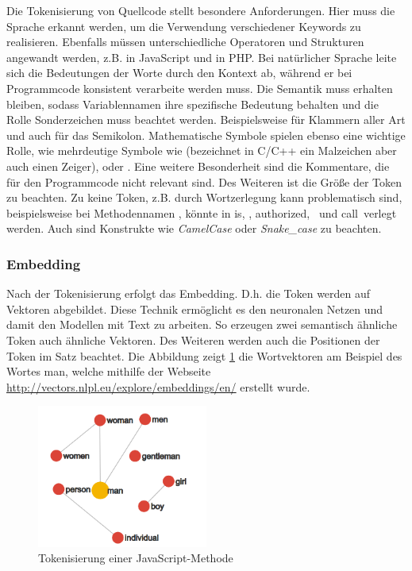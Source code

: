 Die Tokenisierung von Quellcode stellt besondere Anforderungen. Hier muss die Sprache erkannt werden, um die Verwendung verschiedener Keywords zu realisieren. Ebenfalls müssen unterschiedliche Operatoren und Strukturen angewandt werden, z.B. \code{===} in JavaScript und \code{::} in PHP. Bei natürlicher Sprache leite sich die Bedeutungen der Worte durch den Kontext ab, während er bei Programmcode konsistent verarbeite werden muss. Die Semantik muss erhalten bleiben, sodass Variablennamen ihre spezifische Bedeutung behalten und die Rolle Sonderzeichen muss beachtet werden. Beispielsweise für Klammern aller Art und auch für das Semikolon. Mathematische Symbole spielen ebenso eine wichtige Rolle, wie mehrdeutige Symbole wie \code{*} (bezeichnet in C/C++ ein Malzeichen aber auch einen Zeiger), \code{\&} oder \code{|}. Eine weitere Besonderheit sind die Kommentare, die für den Programmcode nicht relevant sind. Des Weiteren ist die Größe der Token zu beachten. Zu keine Token, z.B. durch Wortzerlegung kann problematisch sind, beispielsweise bei Methodennamen , könnte in \grqq is\grqq, \grqq \grqq, \grqq authorized\grqq, \grqq \grqq \ und \grqq call\grqq \ verlegt werden. Auch sind Konstrukte wie \textit{CamelCase} oder \textit{Snake\_case} zu beachten.

\subsubsection{Embedding}
Nach der Tokenisierung erfolgt das Embedding. D.h. die Token werden auf Vektoren abgebildet. Diese Technik ermöglicht es den neuronalen Netzen und damit den Modellen mit Text zu arbeiten. So erzeugen zwei semantisch ähnliche Token auch ähnliche Vektoren. Des Weiteren werden auch die Positionen der Token im Satz beachtet. Die Abbildung zeigt \ref{img:tokenize_transformation} die Wortvektoren am Beispiel des Wortes \glqq man\grqq, welche mithilfe der Webseite \href{http://vectors.nlpl.eu/explore/embeddings/en/}{http://vectors.nlpl.eu/explore/embeddings/en/} erstellt wurde.

\begin{center}
	\begin{figure}[!ht]
		\includegraphics[width=0.5\textwidth]{content/chapter_basics/images/tokenize_transformation.png}
		\centering
		\caption{Tokenisierung einer JavaScript-Methode}
		\label{img:tokenize_transformation}
	\end{figure}
\end{center}



